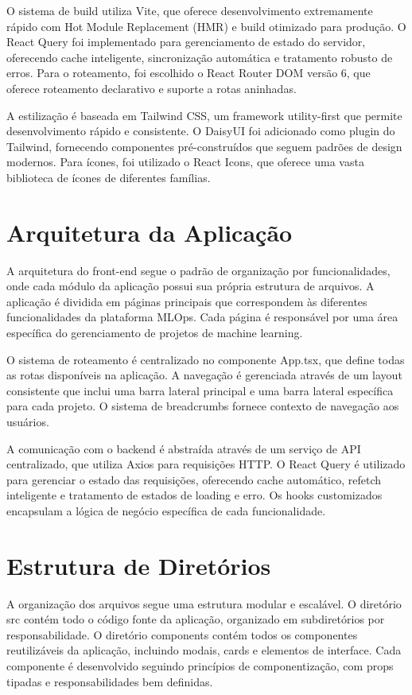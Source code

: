 \documentclass[12pt,a4paper]{article}
\begin{document}
O sistema de build utiliza Vite, que oferece desenvolvimento extremamente rápido com Hot Module Replacement (HMR) e build otimizado para produção. O React Query foi implementado para gerenciamento de estado do servidor, oferecendo cache inteligente, sincronização automática e tratamento robusto de erros. Para o roteamento, foi escolhido o React Router DOM versão 6, que oferece roteamento declarativo e suporte a rotas aninhadas.

A estilização é baseada em Tailwind CSS, um framework utility-first que permite desenvolvimento rápido e consistente. O DaisyUI foi adicionado como plugin do Tailwind, fornecendo componentes pré-construídos que seguem padrões de design modernos. Para ícones, foi utilizado o React Icons, que oferece uma vasta biblioteca de ícones de diferentes famílias.

\section{Arquitetura da Aplicação}

A arquitetura do front-end segue o padrão de organização por funcionalidades, onde cada módulo da aplicação possui sua própria estrutura de arquivos. A aplicação é dividida em páginas principais que correspondem às diferentes funcionalidades da plataforma MLOps. Cada página é responsável por uma área específica do gerenciamento de projetos de machine learning.

O sistema de roteamento é centralizado no componente App.tsx, que define todas as rotas disponíveis na aplicação. A navegação é gerenciada através de um layout consistente que inclui uma barra lateral principal e uma barra lateral específica para cada projeto. O sistema de breadcrumbs fornece contexto de navegação aos usuários.

A comunicação com o backend é abstraída através de um serviço de API centralizado, que utiliza Axios para requisições HTTP. O React Query é utilizado para gerenciar o estado das requisições, oferecendo cache automático, refetch inteligente e tratamento de estados de loading e erro. Os hooks customizados encapsulam a lógica de negócio específica de cada funcionalidade.

\section{Estrutura de Diretórios}

A organização dos arquivos segue uma estrutura modular e escalável. O diretório src contém todo o código fonte da aplicação, organizado em subdiretórios por responsabilidade. O diretório components contém todos os componentes reutilizáveis da aplicação, incluindo modais, cards e elementos de interface. Cada componente é desenvolvido seguindo princípios de componentização, com props tipadas e responsabilidades bem definidas.
\end{document}
